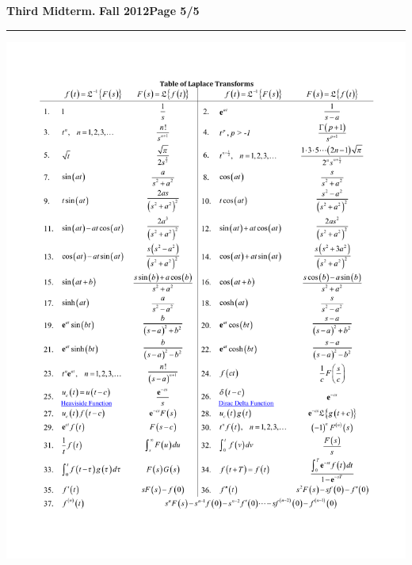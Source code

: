 \documentclass[12pt]{article}
\begin{document}
\hfill{\large\bf Third Midterm.}\hfill{\large\bf
  Fall 2012}\hfill{\large\bf Page 5/5}\hrule

\bigskip
\begin{center}
\includegraphics[width=\linewidth]{table.pdf}
\end{center}
\end{document}
